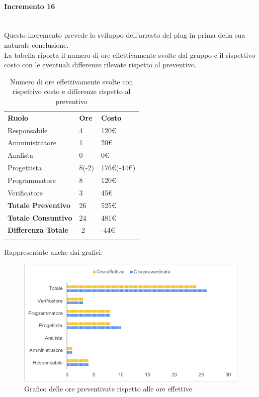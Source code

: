\paragraph{Incremento 16} \mbox{} \\
Questo incremento prevede lo sviluppo dell'arresto del plug-in prima della sua naturale conclusione. \\
La tabella riporta il numero di ore effettivamente svolte dal gruppo e il rispettivo costo con le eventuali differenze rilevate rispetto al preventivo.
\begin{longtable} {							
		>{}p{40mm}  
		>{}p{20mm}	
		>{}p{28mm}			
	}			
	\rowcolor{gray!50}
	
	\textbf{Ruolo}            & \textbf{Ore} & \textbf{Costo}       \TBstrut \\
	Responsabile              & 4            & 120\euro             \TBstrut \\
	Amministratore            & 1            & 20\euro              \TBstrut \\
	Analista                  & 0            & 0\euro               \TBstrut \\
	Progettista               & 8(-2)        & 176\euro(-44\euro)   \TBstrut \\
	Programmatore             & 8            & 120\euro             \TBstrut \\
	Verificatore              & 3            & 45\euro              \TBstrut \\
	\textbf{Totale Preventivo}& 26           & 525\euro             \TBstrut \\	
	\textbf{Totale Consuntivo}& 24           & 481\euro             \TBstrut \\	
	\textbf{Differenza Totale}& -2           & -44\euro             \TBstrut \\
	\rowcolor{white}
	\caption{Numero di ore effettivamente svolte con rispettivo costo e differenze rispetto al preventivo}	
\end{longtable}

Rappresentate anche dai grafici:
\begin{figure} [H]
	\includegraphics[width=\linewidth]{./img/Grafici/41.png}
	\caption{Grafico delle ore preventivate rispetto alle ore effettive}
\end{figure}

